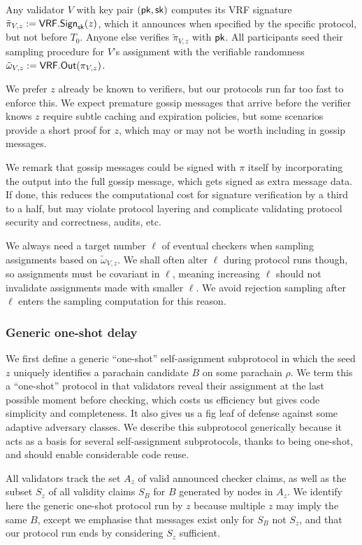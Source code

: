 Any validator $V$ with key pair $(\mathsf{pk},\mathsf{sk})$ computes its VRF signature $\tilde{\pi}_{V,z} := \mathsf{VRF}.\mathsf{Sign}_{\mathsf{sk}}(z)$, which it announces when specified by the specific protocol, but not before $T_0$.  Anyone else verifies $\tilde{\pi}_{V,z}$ with $\mathsf{pk}$.  All participants seed their sampling procedure for $V$'s assignment with the verifiable randomness $\tilde{\omega}_{V,z} := \mathsf{VRF}.\mathsf{Out}(\pi_{V,z})$.

We prefer $z$ already be known to verifiers, but our protocols run far too fast to enforce this.  We expect premature gossip messages that arrive before the verifier knows $z$ require subtle caching and expiration policies, but some scenarios provide a short proof for $z$, which may or may not be worth including in gossip messages.

We remark that gossip messages could be signed with $\pi$ itself by incorporating the output into the full gossip message, which gets signed as extra message data.  If done, this reduces the computational cost for signature verification by a third to a half, but may violate protocol layering and complicate validating protocol security and correctness, audits, etc. 

We always need a target number $\ell$ of eventual checkers when sampling assignments based on $\tilde{\omega}_{V,z}$.  We shall often alter $\ell$ during protocol runs though, so assignments must be covariant in $\ell$, meaning increasing $\ell$ should not invalidate assignments made with smaller $\ell$.  We avoid rejection sampling after $\ell$ enters the sampling computation for this reason.

\subsubsection{Generic one-shot delay}

We first define a generic ``one-shot'' self-assignment subprotocol in which the seed $z$ uniquely identifies a parachain candidate $B$ on some parachain $\rho$.  We term this a ``one-shot'' protocol in that validators reveal their assignment at the last possible moment before checking, which costs us efficiency but gives code simplicity and completeness.  It also gives us a fig leaf of defense against some adaptive adversary classes.  We describe this subprotocol generically because it acts as a basis for several self-assignment subprotocols, thanks to being one-shot, and should enable considerable code reuse.  

All validators track the set $A_z$ of valid announced checker claims, as well as the subset $S_z$ of all validity claims $S_B$ for $B$ generated by nodes in $A_z$.  We identify here the generic one-shot protocol run by $z$ because multiple $z$ may imply the same $B$, except we emphasise that messages exist only for $S_B$ not $S_z$, and that our protocol run ends by considering $S_z$ sufficient.  

